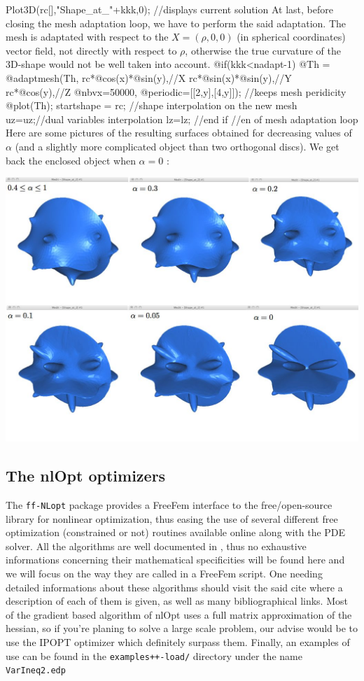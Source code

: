 \documentclass[a4paper,twoside,12pt]{book}
\begin{document}
{Plot3D(rc[],"Shape_at_"+kkk,0); //displays current solution
\eFF
At last, before closing the mesh adaptation loop, we have to perform the said adaptation. The mesh is adaptated with respect to the $X=(\rho,0,0)$ (in spherical coordinates) vector field, not
directly with respect to $\rho$, otherwise the true curvature of the 3D-shape would not be well taken into account.
\bFF
@if(kkk<nadapt-1)
{
  @Th = @adaptmesh(Th,
         rc*@cos(x)*@sin(y),//X
         rc*@sin(x)*@sin(y),//Y
         rc*@cos(y),//Z
         @nbvx=50000,
         @periodic=[[2,y],[4,y]]); //keeps mesh peridicity
  @plot(Th);
  startshape = rc; //shape interpolation on the new mesh
  uz=uz;//dual variables interpolation
  lz=lz;
} //end if
} //en of mesh adaptation loop
\eFF
Here are some pictures of the resulting surfaces obtained for decreasing values of $\alpha$ (and a slightly more complicated object than two orthogonal discs). We get back the enclosed object when $\alpha=0$ :

\begin{center} \includegraphics[width=16.5cm] {minsurf3D} \end{center}


\subsection{The nlOpt optimizers}
The {\tt ff-NLopt}  package provides a FreeFem interface to the free/open-source library for nonlinear optimization, thus easing the use of several different free optimization (constrained or not) routines available
online along with the PDE solver. All the algorithms are well documented in \cite{nlopt}, thus no exhaustive informations concerning their mathematical specificities will be found here and we will focus on 
the way they are called in a FreeFem script. One needing detailed informations about these algorithms should visit the said cite where a description of each of them is given, as well as many bibliographical links. 
Most of the gradient based algorithm of nlOpt uses a full matrix approximation of the hessian, so if you're planing to solve a large scale problem, our advise would be to use the IPOPT optimizer which definitely surpass them. Finally, an examples of use can be found in the {\tt examples++-load/} directory under the name {\tt VarIneq2.edp}
\end{document}
